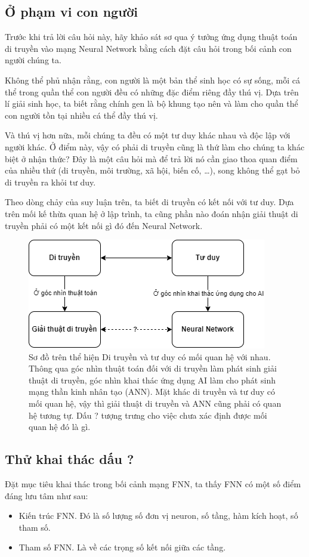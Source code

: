 \subsection{Ở phạm vi con người}
	Trước khi trả lời câu hỏi này, hãy khảo sát sơ qua ý tưởng ứng dụng thuật toán di truyền vào mạng Neural Network bằng cách đặt câu hỏi trong bối cảnh con người chúng ta.
	
	Không thể phủ nhận rằng, con người là một bản thể sinh học có sự sống, mỗi cá thể trong quần thể con người đều có những đặc điểm riêng đầy thú vị. Dựa trên lí giải sinh học, ta biết rằng chính gen là bộ khung tạo nên và làm cho quần thể con người tồn tại nhiều cá thể đầy thú vị.
	
	Và thú vị hơn nữa, mỗi chúng ta đều có một tư duy khác nhau và độc lập với người khác. Ở điểm này, vậy có phải di truyền cũng là thứ làm cho chúng ta khác biệt ở nhận thức? Đây là một câu hỏi mà để trả lời nó cần giao thoa quan điểm của nhiều thứ (di truyền, môi trường, xã hội, biến cố, …), song không thể gạt bỏ di truyền ra khỏi tư duy.
	
	Theo dòng chảy của suy luận trên, ta biết di truyền có kết nối với tư duy. Dựa trên mối kế thừa quan hệ ở lập trình, ta cũng phần nào đoán nhận giải thuật di truyền phải có một kết nối gì đó đến Neural Network.
	
	\begin{figure}[h]
		\centering
		\includegraphics{figures/thought_and_genetic.png}
		\caption{Sơ đồ trên thể hiện Di truyền và tư duy có mối quan hệ với nhau. Thông qua góc nhìn thuật toán đối với di truyền làm phát sinh giải thuật di truyền, góc nhìn khai thác ứng dụng AI làm cho phát sinh mạng thần kinh nhân tạo (ANN). Mặt khác di truyền và tư duy có mối quan hệ, vậy thì giải thuật di truyền và ANN cũng phải có quan hệ tương tự. Dấu ? tượng trưng cho việc chưa xác định được mối quan hệ đó là gì.}
		\label{fig:thought_and_genetic}
	\end{figure}
	
\subsection{Thử khai thác dấu ?}
	Đặt mục tiêu khai thác trong bối cảnh mạng FNN, ta thấy FNN có một số điểm đáng lưu tâm như sau:
	\begin{itemize}
		\item Kiến trúc FNN. Đó là số lượng số đơn vị neuron, số tầng, hàm kích hoạt, số tham số.
		\item Tham số FNN. Là về các trọng số kết nối giữa các tầng. 
	\end{itemize}
	
